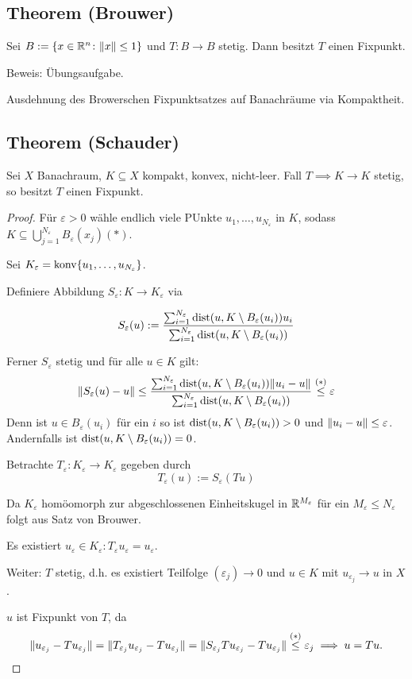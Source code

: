 \subsection{Theorem (Brouwer)}

Sei $B := \{ x \in \mathbb{R}^n \colon \lVert x \rVert \leq 1\}$ und $T \colon B \to B$ stetig.
Dann besitzt $T$ einen Fixpunkt.

Beweis: Übungsaufgabe.

Ausdehnung des Browerschen Fixpunktsatzes auf Banachräume via Kompaktheit.

\subsection{Theorem (Schauder)}

Sei $X$ Banachraum, $K \subseteq X$ kompakt, konvex, nicht-leer.
Fall $T \implies K \to K$ stetig, so besitzt $T$ einen Fixpunkt.

\begin{proof}
  Für $\varepsilon > 0$ wähle endlich viele PUnkte $u_1, \dots, u_{N_\varepsilon}$ in $K$, sodass $K \subseteq \bigcup_{j = 1}^{N_\varepsilon} B_\varepsilon(x_j) (\ast)$.

  Sei $K_\varepsilon = \operatorname{konv}\{u_1, \dots, u_{N_\varepsilon}\}$.

  Definiere Abbildung $S_\varepsilon \colon K \to K_\varepsilon$ via

  $$
  S_\varepsilon(u) := \frac{ \sum_{i = 1}^{N_\varepsilon} \operatorname{dist}(u, K \setminus B_\varepsilon(u_i)) u_i}{\sum_{i = 1}^{N_\varepsilon} \operatorname{dist}(u, K \setminus B_\varepsilon(u_i))}
  $$

  Ferner $S_\varepsilon$ stetig und für alle $u \in K$ gilt:
  $$
  \lVert S_\varepsilon(u) - u \rVert \leq \frac{ \sum_{i = 1}^{N_\varepsilon} \operatorname{dist}(u, K \setminus B_\varepsilon(u_i)) \lVert u_i - u \rVert}{\sum_{i = 1}^{N_\varepsilon} \operatorname{dist}(u, K \setminus B_\varepsilon(u_i))}
  \overset{(\ast)}{\leq} \varepsilon
  $$
  {\tiny{Denn ist $u \in B_\varepsilon(u_i)$ für ein $i$ so ist $\operatorname{dist}(u, K\setminus B_\varepsilon(u_i)) > 0$ und $\lVert u_i - u \rVert \leq \varepsilon$. Andernfalls ist $\operatorname{dist}(u, K\setminus B_\varepsilon(u_i)) = 0$.}}

  Betrachte $T_\varepsilon \colon K_\varepsilon \to K_\varepsilon$ gegeben durch $$T_\varepsilon(u) := S_\varepsilon(Tu)$$

  Da $K_\varepsilon$ homöomorph zur abgeschlossenen Einheitskugel in $\mathbb{R}^{M_\varepsilon}$ für ein $M_\varepsilon \leq N_\varepsilon$ folgt aus Satz von Brouwer.

  Es existiert $u_\varepsilon \in K_\varepsilon \colon T_\varepsilon u_\varepsilon = u_\varepsilon$.

  Weiter: $T$ stetig, d.h. es existiert Teilfolge $(\varepsilon_j) \to 0$ und $u \in K$ mit $u_{\varepsilon_j} \to u$ in $X$.

  $u$ ist Fixpunkt von $T$, da 
  $$
  \lVert u_{\varepsilon_j} - Tu_{\varepsilon_j} \rVert = \lVert T_{\varepsilon_j} u_{\varepsilon_j} - T u_{\varepsilon_j} \rVert = \lVert S_{\varepsilon_j} Tu_{\varepsilon_j} - T u_{\varepsilon_j} \rVert \overset{(\ast)} \leq \varepsilon_j \implies u = Tu.
  $$
\end{proof}

